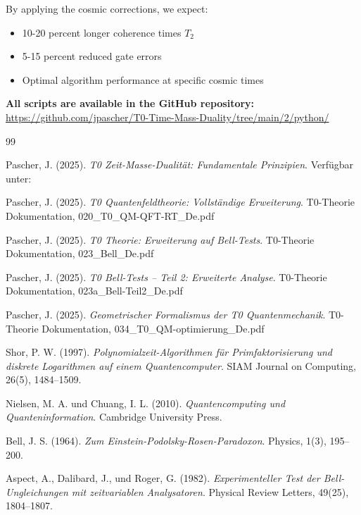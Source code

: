 By applying the cosmic corrections, we expect:

\begin{itemize}
	\item 10-20 percent longer coherence times $T_2$
	\item 5-15 percent reduced gate errors
	\item Optimal algorithm performance at specific cosmic times
\end{itemize}

\textbf{All scripts are available in the GitHub repository:} \\
\url{https://github.com/jpascher/T0-Time-Mass-Duality/tree/main/2/python/}
\begin{thebibliography}{99}
	
	Pascher, J. (2025). 
	\textit{T0 Zeit-Masse-Dualität: Fundamentale Prinzipien}. 
	Verfügbar unter: 
	
	Pascher, J. (2025). 
	\textit{T0 Quantenfeldtheorie: Vollständige Erweiterung}. 
	T0-Theorie Dokumentation, 020\_T0\_QM-QFT-RT\_De.pdf
	
	Pascher, J. (2025). 
	\textit{T0 Theorie: Erweiterung auf Bell-Tests}. 
	T0-Theorie Dokumentation, 023\_Bell\_De.pdf
	
	Pascher, J. (2025). 
	\textit{T0 Bell-Tests -- Teil 2: Erweiterte Analyse}. 
	T0-Theorie Dokumentation, 023a\_Bell-Teil2\_De.pdf
	
	Pascher, J. (2025). 
	\textit{Geometrischer Formalismus der T0 Quantenmechanik}. 
	T0-Theorie Dokumentation, 034\_T0\_QM-optimierung\_De.pdf
	
	Shor, P. W. (1997). 
	\textit{Polynomialzeit-Algorithmen für Primfaktorisierung und diskrete Logarithmen auf einem Quantencomputer}. 
	SIAM Journal on Computing, 26(5), 1484--1509.
	
	Nielsen, M. A. und Chuang, I. L. (2010). 
	\textit{Quantencomputing und Quanteninformation}. 
	Cambridge University Press.
	
	Bell, J. S. (1964). 
	\textit{Zum Einstein-Podolsky-Rosen-Paradoxon}. 
	Physics, 1(3), 195--200.
	
	Aspect, A., Dalibard, J., und Roger, G. (1982). 
	\textit{Experimenteller Test der Bell-Ungleichungen mit zeitvariablen Analysatoren}. 
	Physical Review Letters, 49(25), 1804--1807.
	

\end{thebibliography}
